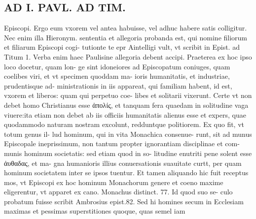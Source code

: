\documentclass{article}
\begin{document}
\begin{pages}
\section*{AD I. PAVL. AD TIM. }
\marginpar{[ p.142 ]}\pstart Episcopi. Ergo eum vxorem vel antea habuisse, vel adhuc habere satis colligitur. Nec enim illa Hieronym. sententia et allegoria probanda est, qui nomine filiorum et filiarum Episcopi cogi- tutionte te epr Aintelligi vult, vt scribit in Epist. ad Titum 1. Verba enim haec Paulisine allegoria debent accipi.  \pend\pstart Praeterea ex hoc ipso loco docetur, quam lon- ge sint idoneiores ad Episcopatum coniuges, quam coelibes viri, et vt specimen quoddam ma- ioris humanitatis, et industriae, prudentisque ad- ministrationis in iis appareat, qui familiam habent, id est, vxorem et liberos: quam qui perpetuo coe- libes et solitarii vixerunt. Certe vt non debet homo Christianus esse ἀπολίς, et tanquam fera quaedam in solitudine vaga viuere:ita etiam non debet ab iis officiis humanitatis alienus esse et expers, quae quodammodo naturam nostram excolunt, redduntque  politiorem. Ex quo fit, vt totum genus il- lud hominum, qui in vita Monachica consenue- runt, sit ad munus Episcopale ineprissimum, non tantum propter ignorantiam disciplinae et com- munis hominum societatis: sed etiam quod in so- litudine enutriti pene solent esse ἀυθαδας, et ma- gna humanioris illius conuersationis suauitate curtt, per quam hominum societatem inter se ipsos tuentur. Et tamen aliquando hic fuit receptus mos, vt Episcopi ex hoc hominum Monachorum genere et coeno maxime eligerentur, vt apparet ex cano. Monachus distinct. 77. Id quod suo se- culo probatum fuisse scribit Ambrosius epist.82. Sed hi homines secum in Ecclesiam maximas et pessimas superstitiones quoque, quas semel iam  \pend

\end{pages}
\end{document}
